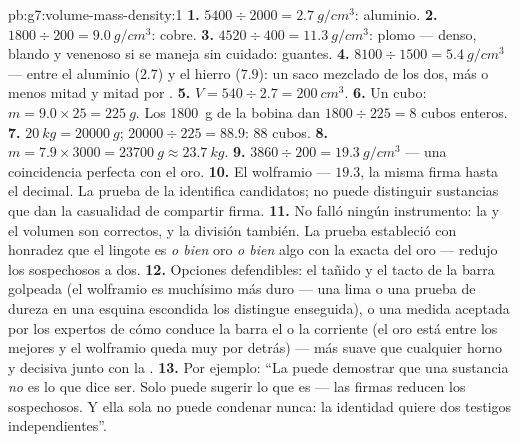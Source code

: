 \begin{solution}{pb:g7:volume-mass-density:1}
\textbf{1.} $5400 \div 2000 = \qty{2.7}{g/cm^3}$: aluminio.
\textbf{2.} $1800 \div 200 = \qty{9.0}{g/cm^3}$: cobre.
\textbf{3.} $4520 \div 400 = \qty{11.3}{g/cm^3}$: plomo --- denso,
blando y venenoso si se maneja sin cuidado: guantes.
\textbf{4.} $8100 \div 1500 = \qty{5.4}{g/cm^3}$ --- entre el
aluminio ($2.7$) y el hierro ($7.9$): un saco mezclado de los dos,
más o menos mitad y mitad por .
\textbf{5.} $V = 540 \div 2.7 = \qty{200}{cm^3}$.
\textbf{6.} Un cubo: $m = 9.0 \times 25 = \qty{225}{g}$. Los
\qty{1800}{g} de la bobina dan $1800 \div 225 = 8$ cubos enteros.
\textbf{7.} $\qty{20}{kg} = \qty{20000}{g}$;
$20000 \div 225 = 88.9$: $88$ cubos.
\textbf{8.} $m = 7.9 \times 3000 = \qty{23700}{g} \approx
\qty{23.7}{kg}$.
\textbf{9.} $3860 \div 200 = \qty{19.3}{g/cm^3}$ --- una coincidencia
perfecta con el oro.
\textbf{10.} El wolframio ---  $19.3$, la misma firma hasta
el decimal. La prueba de la  identifica candidatos; no puede
distinguir sustancias que dan la casualidad de compartir firma.
\textbf{11.} No falló ningún instrumento: la  y el
volumen son correctos, y la división también. La prueba estableció
con honradez que el lingote es \emph{o bien} oro \emph{o bien} algo
con la  exacta del oro --- redujo los sospechosos a dos.
\textbf{12.} Opciones defendibles: el tañido y el tacto de la barra
golpeada (el wolframio es muchísimo más duro --- una lima o una prueba
de dureza en una esquina escondida los distingue enseguida), o una
medida aceptada por los expertos de cómo conduce la barra el
 o la corriente (el oro está entre los mejores
 y el wolframio queda muy por detrás) --- más suave que
cualquier horno y decisiva junto con la .
\textbf{13.} Por ejemplo: ``La  puede demostrar que una
sustancia \emph{no} es lo que dice ser. Solo puede sugerir lo que es
--- las firmas reducen los sospechosos. Y ella sola no puede condenar
nunca: la identidad quiere dos testigos independientes''.
\end{solution}
